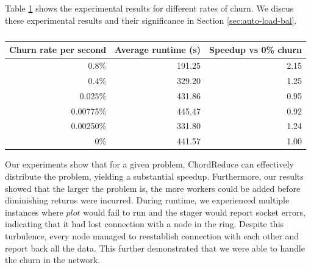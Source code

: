 Table \ref{tab:churnSpeed} shows the experimental results for different rates of churn. 
We discus these experimental results and their significance in Section \ref{sec:auto-load-bal}.
\begin{table}
	\centering
	\begin{tabular}{|r|r|r|}
		\hline
		Churn rate per second & Average runtime (s) & Speedup vs 0\% churn\\ \hline{}
		0.8\% & 191.25 & 2.15 \\ \hline
		0.4\% & 329.20 & 1.25 \\ \hline
		0.025\% & 431.86 & 0.95 \\ \hline
		0.00775\%  & 445.47 & 0.92 \\ \hline
		0.00250\% & 331.80  &  1.24 \\ \hline
		0\% & 441.57 & 1.00 \\ \hline
	\end{tabular}
	\caption{}
	\label{tab:churnSpeed}
\end{table}





Our experiments show that for a given problem, ChordReduce can effectively distribute the problem, yielding a substantial speedup.  
Furthermore, our results showed that the larger the problem is, the more workers could be added before diminishing returns were incurred.  
During runtime, we experienced multiple instances where $plot$ would fail to run and the stager would report socket errors, indicating that it had lost connection with a node in the ring.  Despite this turbulence, every node managed to reestablish connection with each other and report back all the data.  
This further demonstrated that we were able to handle the churn in the network.


